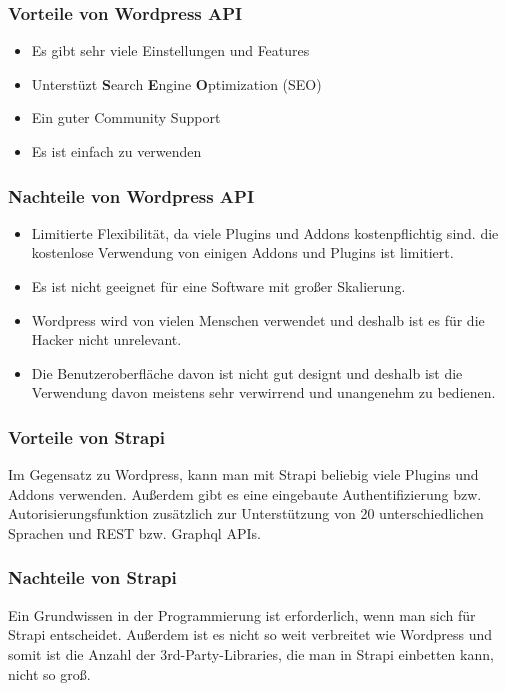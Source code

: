 \begin{spacing}{1}
    \subsubsection{Vorteile von Wordpress API}

    \begin{itemize}
        \item Es gibt sehr viele Einstellungen und Features
        \item Unterstüzt \textbf{S}earch \textbf{E}ngine \textbf{O}ptimization (SEO)
        \item Ein guter Community Support
        \item Es ist einfach zu verwenden
    \end{itemize}
    \cite{strapi-vs-wordpress}

    \subsubsection{Nachteile von Wordpress API}
    \begin{itemize}
        \item  Limitierte Flexibilität, da viele Plugins und Addons kostenpflichtig sind.
              die kostenlose Verwendung von einigen Addons und Plugins ist limitiert.
        \item Es ist nicht geeignet für eine Software mit großer Skalierung.
        \item Wordpress wird von vielen Menschen verwendet und deshalb ist es für die Hacker nicht unrelevant.
        \item Die Benutzeroberfläche davon ist nicht gut designt und deshalb ist die Verwendung davon meistens sehr verwirrend und unangenehm zu bedienen.
    \end{itemize}
    \cite{strapi-vs-wordpress}

    \subsubsection{Vorteile von Strapi}

    Im Gegensatz zu Wordpress, kann man mit Strapi beliebig viele Plugins und Addons
    verwenden. Außerdem gibt es eine eingebaute Authentifizierung bzw. Autorisierungsfunktion
    zusätzlich zur Unterstützung von 20 unterschiedlichen Sprachen und REST
    bzw. Graphql APIs.
    \cite{strapi-vs-wordpress}

    \subsubsection{Nachteile von Strapi}
    Ein Grundwissen in der Programmierung ist erforderlich, wenn man sich für Strapi
    entscheidet. Außerdem ist es nicht so weit verbreitet wie Wordpress und somit ist die Anzahl
    der 3rd-Party-Libraries, die man in Strapi einbetten kann, nicht so groß.
    \cite{strapi-vs-wordpress}


\end{spacing}
